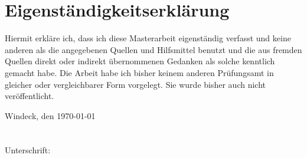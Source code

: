 \section{Eigenständigkeitserklärung}

\vspace*{\fill}

Hiermit erkläre ich, dass ich diese Masterarbeit eigenständig verfasst und
keine anderen als die angegebenen Quellen und Hilfsmittel benutzt und die aus
fremden Quellen direkt oder indirekt übernommenen Gedanken als solche kenntlich 
gemacht habe. Die Arbeit habe ich bisher keinem anderen Prüfungsamt in gleicher
oder vergleichbarer Form vorgelegt. Sie wurde bisher auch nicht veröffentlicht.

Windeck, den \today
\\
\\
\\
Unterschrift: \hrulefill

\vspace*{\fill}